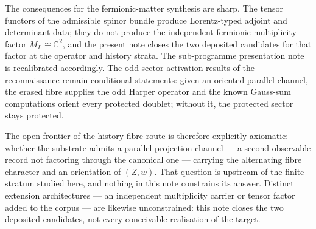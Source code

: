 \documentclass[11pt,a4paper]{article}
\theoremstyle{definition}
\theoremstyle{remark}
\newcommand{\C}{\mathbb{C}}
\begin{document}
The consequences for the fermionic-matter synthesis are sharp.
The tensor functors of the admissible spinor bundle produce Lorentz-typed adjoint and
determinant data; they do not produce the independent fermionic multiplicity factor
$M_L\cong\C^2$, and the present note closes the two deposited candidates for that factor
at the operator and history strata.
The sub-programme presentation note is recalibrated accordingly.
The odd-sector activation results of the reconnaissance remain conditional statements:
given an oriented parallel channel, the erased fibre supplies the odd Harper operator
and the known Gauss-sum computations orient every protected doublet; without it, the
protected sector stays protected.

The open frontier of the history-fibre route is therefore explicitly axiomatic: whether
the substrate admits a parallel projection channel --- a second observable record not
factoring through the canonical one --- carrying the alternating fibre character and an
orientation of $(Z,w)$.
That question is upstream of the finite stratum studied here, and nothing in this note
constrains its answer.
Distinct extension architectures --- an independent multiplicity carrier or tensor
factor added to the corpus --- are likewise unconstrained: this note closes the two
deposited candidates, not every conceivable realisation of the target.

\newpage


\end{document}
